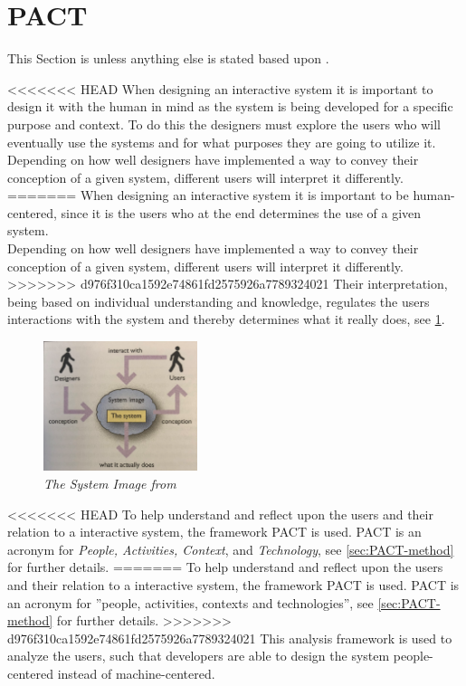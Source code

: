 \section{PACT}\label{sec:PACT}
This Section is unless anything else is stated based upon \cite{Benyon}.

<<<<<<< HEAD
When designing an interactive system it is important to design it with the human in mind as the system is being developed for a specific purpose and context.
To do this the designers must explore the users who will eventually use the systems and for what purposes they are going to utilize it. 
Depending on how well designers have implemented a way to convey their conception of a given system, different users will interpret it differently. 
=======
When designing an interactive system it is important to be human-centered, since it is the users who at the end determines the use of a given system.
\\\indent
Depending on how well designers have implemented a way to convey their conception of a given system, different users will interpret it differently.
>>>>>>> d976f310ca1592e74861fd2575926a7789324021
Their interpretation, being based on individual understanding and knowledge, regulates the users interactions with the system and thereby determines what it really does, see \cref{fig:PACT-SystemImage}.

\begin{figure}[H]
	\centering
	\includegraphics[width=0.4\textwidth]{billeder/SystemImage-Benyon.png}
	\caption{\textit{The System Image from
			\citep[p.~31]{Benyon} %
		}}
	\label{fig:PACT-SystemImage}
\end{figure}

<<<<<<< HEAD
To help understand and reflect upon the users and their relation to a interactive system, the framework PACT is used. 
PACT is an acronym for \textit{People, Activities, Context}, and \textit{Technology}, see \cref{sec:PACT-method} for further details.
=======
To help understand and reflect upon the users and their relation to a interactive system, the framework PACT is used.
PACT is an acronym for ''people, activities, contexts and technologies'', see \cref{sec:PACT-method} for further details.
>>>>>>> d976f310ca1592e74861fd2575926a7789324021
This analysis framework is used to analyze the users, such that developers are able to design the system people-centered instead of machine-centered.

